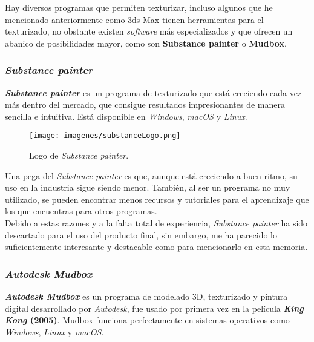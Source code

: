 Hay diversos programas que permiten texturizar, incluso algunos que he mencionado anteriormente como 3ds Max tienen herramientas para el texturizado, no obstante existen \textit{software} más especializados y que ofrecen un abanico de posibilidades mayor, como son \textbf{Substance painter} o \textbf{Mudbox}.
\\
	
	\subsubsection{\textit{Substance painter}}
	
	\textit{\textbf{Substance painter}} es un programa de texturizado que está creciendo cada vez más dentro del mercado, que consigue resultados impresionantes de manera sencilla e intuitiva. Está disponible en \textit{Windows}, \textit{macOS} y \textit{Linux}.
	\\
	
	\begin{wrapfigure}{i}{0.6\textwidth}
		\vspace{-30pt}
		\begin{center}
			\vspace{-10pt}
			\texttt{[image: imagenes/substanceLogo.png]}
			\caption{Logo de \textit{Substance painter}.}
			\vspace{-10pt}
		\end{center}
		\vspace{-30pt}
	\end{wrapfigure}
	
Una pega del \textit{Substance painter} es que, aunque está creciendo a buen ritmo, su uso en la industria sigue siendo menor. También, al ser un programa no muy utilizado, se pueden encontrar menos recursos y tutoriales para el aprendizaje que los que encuentras para otros programas.
\\
	
Debido a estas razones y a la falta total de experiencia, \textit{Substance painter} ha sido descartado para el uso del producto final, sin embargo, me ha parecido lo suficientemente interesante y destacable como para mencionarlo en esta memoria.
\\


	\subsubsection{\textit{Autodesk Mudbox}}

\textit{\textbf{Autodesk Mudbox}} es un programa de modelado 3D, texturizado y pintura digital desarrollado por \textit{Autodesk}, fue usado por primera vez en la película \textbf{\textit{King Kong} (2005)}. Mudbox funciona perfectamente en sistemas operativos como \textit{Windows}, \textit{Linux} y \textit{macOS}.
\\

